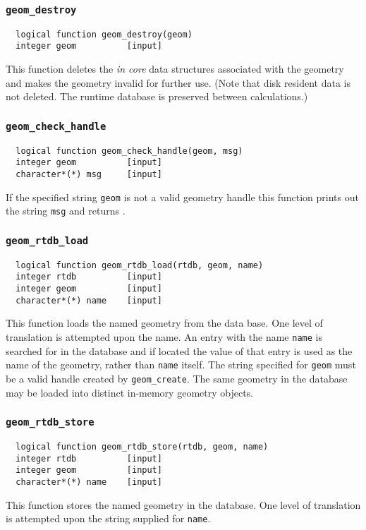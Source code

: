 \subsubsection{{\tt geom\_destroy}}
\begin{verbatim}
  logical function geom_destroy(geom)
  integer geom          [input]
\end{verbatim}
This function deletes the {\em in core} data structures associated with the geometry and
makes the geometry invalid for further use.  (Note that disk resident data is
not deleted.  The runtime database is preserved between calculations.)

\subsubsection{{\tt geom\_check\_handle}}
\begin{verbatim}
  logical function geom_check_handle(geom, msg)
  integer geom          [input]
  character*(*) msg     [input]
\end{verbatim}
If the specified string {\tt geom} is not a valid geometry handle
 this function prints out 
the string {\tt msg}
and returns \FALSE.

\subsubsection{{\tt geom\_rtdb\_load}}
\begin{verbatim}
  logical function geom_rtdb_load(rtdb, geom, name)
  integer rtdb          [input]
  integer geom          [input]
  character*(*) name    [input]
\end{verbatim}
This function loads the named geometry from the data base.  One level of translation is
attempted upon the name.  An entry with the name {\tt name} is searched
for in the database and if located the value of that entry is used as
the name of the geometry, rather than {\tt name} itself.  The string specified
for {\tt geom}
must be a valid handle created by \verb+geom_create+.  The same
geometry in the database may be loaded into distinct in-memory geometry
objects.

\subsubsection{{\tt geom\_rtdb\_store}}
\begin{verbatim}
  logical function geom_rtdb_store(rtdb, geom, name)
  integer rtdb          [input]
  integer geom          [input]
  character*(*) name    [input]
\end{verbatim}  
This function stores the named geometry in the database.  One level of translation is
attempted upon the string supplied for \verb+name+.

